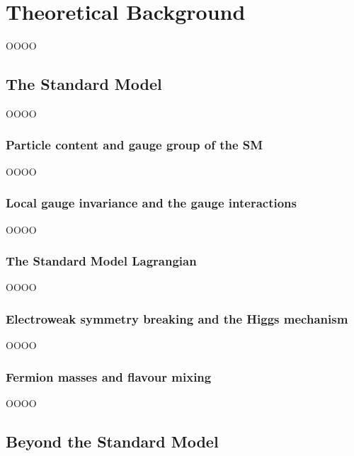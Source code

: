 \chapter{Theoretical Background}
\label{chap:chapter-2}

OOOO

\section{The Standard Model}
\label{heading:Chapters-CH2-2}

OOOO

\subsection{Particle content and gauge group of the SM}
\label{heading:Chapters-CH2-3}

OOOO

\subsection{Local gauge invariance and the gauge interactions}
\label{heading:Chapters-CH2-4}

OOOO

\subsection{The Standard Model Lagrangian}
\label{heading:Chapters-CH2-5}

OOOO

\subsection{Electroweak symmetry breaking and the Higgs mechanism}
\label{heading:Chapters-CH2-6}

OOOO

\subsection{Fermion masses and flavour mixing}
\label{heading:Chapters-CH2-7}

OOOO

\section{Beyond the Standard Model}
\label{heading:Chapters-CH2-8}

